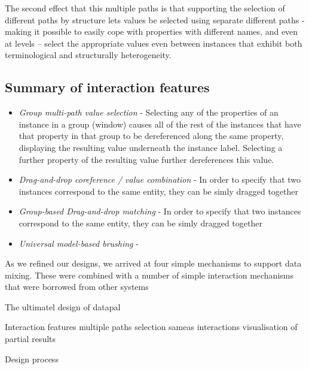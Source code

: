 \documentclass{sigchi}
\begin{document}
The second effect that this multiple paths is that supporting the selection of different paths by structure lets values be selected using separate different paths - making it possible to easily cope with properties with different names, and even at levels -- select the appropriate values even between instances that exhibit both  terminological and structurally heterogeneity.


\subsection{Summary of interaction features}

\begin{itemize}
\item \emph{Group multi-path value selection} - Selecting any of the properties of an instance in a group (window) causes all of the rest of the instances that have that property in that group to be dereferenced along the same property, displaying the resulting value underneath the instance label.  Selecting a further property of the resulting value further dereferences this value.
\item \emph{Drag-and-drop coreference / value combination} - In order to specify that two instances correspond to the same entity, they can be simly dragged together
\item \emph{Group-based Drag-and-drop matching} - In order to specify that two instances correspond to the same entity, they can be simly dragged together
\item \emph{Universal model-based brushing} -
\end{itemize}


As we refined our designs, we arrived at four simple mechanisms to support data mixing.  These were combined with a number of simple interaction mechanisms that were borrowed from other systems

The ultimatel design of datapal

Interaction features 
	multiple paths selection
	sameas interactions
	visualisation of partial results

Design process
\end{document}

